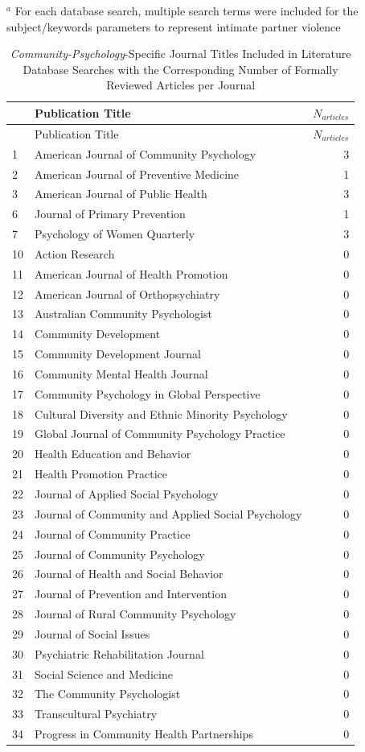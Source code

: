 \documentclass[11pt,]{tufte-book}
\begin{document}
\tufteskip

\footnotesize{$^a$ For each database search, multiple search terms were included for the subject/keywords parameters to represent intimate partner violence}

\newpage

\begin{longtable}[]{@{}llr@{}}
\caption{\emph{Community-Psychology}-Specific Journal Titles Included in
Literature Database Searches with the Corresponding Number of Formally
Reviewed Articles per Journal \label{tbl:jcp}}\tabularnewline
\toprule
& Publication Title & \(N_{articles}\)\tabularnewline
\midrule
\endfirsthead
\toprule
& Publication Title & \(N_{articles}\)\tabularnewline
\midrule
\endhead
1 & American Journal of Community Psychology & 3\tabularnewline
2 & American Journal of Preventive Medicine & 1\tabularnewline
3 & American Journal of Public Health & 3\tabularnewline
6 & Journal of Primary Prevention & 1\tabularnewline
7 & Psychology of Women Quarterly & 3\tabularnewline
10 & Action Research & 0\tabularnewline
11 & American Journal of Health Promotion & 0\tabularnewline
12 & American Journal of Orthopsychiatry & 0\tabularnewline
13 & Australian Community Psychologist & 0\tabularnewline
14 & Community Development & 0\tabularnewline
15 & Community Development Journal & 0\tabularnewline
16 & Community Mental Health Journal & 0\tabularnewline
17 & Community Psychology in Global Perspective & 0\tabularnewline
18 & Cultural Diversity and Ethnic Minority Psychology &
0\tabularnewline
19 & Global Journal of Community Psychology Practice & 0\tabularnewline
20 & Health Education and Behavior & 0\tabularnewline
21 & Health Promotion Practice & 0\tabularnewline
22 & Journal of Applied Social Psychology & 0\tabularnewline
23 & Journal of Community and Applied Social Psychology &
0\tabularnewline
24 & Journal of Community Practice & 0\tabularnewline
25 & Journal of Community Psychology & 0\tabularnewline
26 & Journal of Health and Social Behavior & 0\tabularnewline
27 & Journal of Prevention and Intervention & 0\tabularnewline
28 & Journal of Rural Community Psychology & 0\tabularnewline
29 & Journal of Social Issues & 0\tabularnewline
30 & Psychiatric Rehabilitation Journal & 0\tabularnewline
31 & Social Science and Medicine & 0\tabularnewline
32 & The Community Psychologist & 0\tabularnewline
33 & Transcultural Psychiatry & 0\tabularnewline
34 & Progress in Community Health Partnerships & 0\tabularnewline
\bottomrule
\end{longtable}

\newpage
\end{document}
